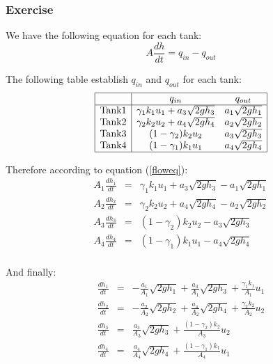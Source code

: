 \subsubsection{Exercise} 

We have the following equation for each tank:
\begin{equation}
A \frac{dh}{dt} = q_{in} - q_{out} 
\label{floweq}
\end{equation}

The following table establish $q_{in}$ and $q_{out}$ for each tank:
$$
\begin{array}{|c|cc|}
    \hline
    & q_{in} & q_{out} \\
    \hline
    \text{Tank} 1 & \gamma_1k_1u_1+a_3\sqrt{2gh_3} & a_1\sqrt{2gh_1} \\
    \text{Tank} 2 & \gamma_2k_2u_2+a_4\sqrt{2gh_4} & a_2\sqrt{2gh_2} \\
    \text{Tank} 3 & (1-\gamma_2)k_2u_2 & a_3\sqrt{2gh_3} \\ 
    \text{Tank} 4 & (1-\gamma_1)k_1u_1 & a_4\sqrt{2gh_4} \\ 
    \hline
\end{array}
$$

Therefore according to equation (\ref{floweq}): 
$$
    \begin{array}{rcl}
    A_1 \frac{dh_1}{dt} & = &
        \gamma_1k_1u_1+a_3\sqrt{2gh_3} - a_1\sqrt{2gh_1} \\
    A_2 \frac{dh_2}{dt} & = &
        \gamma_2k_2u_2+a_4\sqrt{2gh_4} - a_2\sqrt{2gh_2} \\
    A_3 \frac{dh_3}{dt} & = &
        (1-\gamma_2)k_2u_2 - a_3\sqrt{2gh_3} \\ 
    A_4 \frac{dh_4}{dt} & = &
    (1-\gamma_1)k_1u_1 - a_4\sqrt{2gh_4} \\ 
    \end{array}
$$

And finally:
\begin{equation}
        \begin{array}{rcl}
    \frac{dh_1}{dt} & = &
            - \frac{a_1}{A_1}\sqrt{2gh_1} + \frac{a_3}{A_1}\sqrt{2gh_3} + \frac{\gamma_1k_1}{A_1}u_1\\ 

    \frac{dh_2}{dt} & = &
            - \frac{a_2}{A_2}\sqrt{2gh_2} + \frac{a_4}{A_2}\sqrt{2gh_4} + \frac{\gamma_2k_2}{A_2}u_2\\ 

    \frac{dh_3}{dt} & = &
            \frac{a_3}{A_3}\sqrt{2gh_3}+\frac{(1-\gamma_2)k_2}{A_3}u_2 \\ 

    \frac{dh_4}{dt} & = &
            \frac{a_4}{A_4}\sqrt{2gh_4}+\frac{(1-\gamma_1)k_1}{A_4}u_1 \\ 
        \end{array}
    \label{tanksyseq}
\end{equation}
